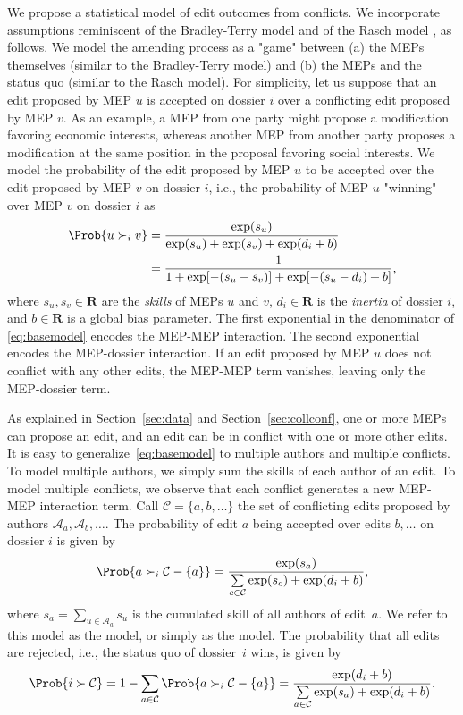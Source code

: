 We propose a statistical model of edit outcomes from conflicts.
We incorporate assumptions reminiscent of the Bradley-Terry model \cite{bradley1952rank} and of the Rasch model \cite{rasch1960probabilistic}, as follows.
We model the amending process as a "game" between (a) the MEPs themselves (similar to the Bradley-Terry model) and (b) the MEPs and the status quo (similar to the Rasch model).
For simplicity, let us suppose that an edit proposed by MEP $u$ is accepted on dossier $i$ over a conflicting edit proposed by MEP $v$.
As an example, a MEP from one party might propose a modification favoring economic interests, whereas another MEP from another party proposes a modification at the same position in the proposal favoring social interests.
We model the probability of the edit proposed by MEP $u$ to be accepted over the edit proposed by MEP $v$ on dossier $i$, i.e., the  probability of MEP $u$ "winning" over MEP $v$ on dossier $i$ as
\begin{align}
	\label{eq:basemodel}
  \Prob{ u \succ_i v }
	 & = \frac{\exp(s_u)}{\exp(s_u) + \exp(s_v) + \exp(d_i + b)} \nonumber  \\
	 & = \frac{1}{1 + \exp[ -( s_u - s_v ) ] + \exp[ -( s_u - d_i ) + b ]},
\end{align}
where $ s_u, s_v \in \mathbf{R} $ are the \textit{skills} of MEPs $u$ and $v$, $ d_i \in \mathbf{R} $ is the \textit{inertia} of dossier $i$, and $ b \in \mathbf{R} $ is a global bias parameter.
The first exponential in the denominator of \eqref{eq:basemodel} encodes the MEP-MEP interaction.
The second exponential encodes the MEP-dossier interaction.
If an edit proposed by MEP $u$ does not conflict with any other edits, the MEP-MEP term vanishes, leaving only the MEP-dossier term.

As explained in Section~\ref{sec:data} and Section~\ref{sec:collconf}, one or more MEPs can propose an edit, and an edit can be in conflict with one or more other edits.
It is easy to generalize~\eqref{eq:basemodel} to multiple authors and multiple conflicts.
To model multiple authors, we simply sum the skills of each author of an edit.
To model multiple conflicts, we observe that each conflict generates a new MEP-MEP interaction term.
Call \mbox{$\mathcal{C} = \{ a, b, \dots \}$} the set of conflicting edits proposed by authors $ \mathcal{A}_a, \mathcal{A}_b, \dots $.
The probability of edit $a$ being accepted over edits $b, \dots$ on dossier $i$ is given by
\begin{equation}
	\label{eq:multiple}
	\Prob{ a \succ_i \mathcal{C} - \{ a\} } =
	\frac{\exp(s_a) }{ \sum\limits_{c \in \mathcal{C} } \exp(s_c) + \exp(d_i + b) },
\end{equation}
where $s_a = \sum_{u \in \mathcal{A}_a} s_u$ is the cumulated skill of all authors of edit~$a$.
We refer to this model as the \warofwords{} model, or simply as the \wow{} model.
The probability that all edits are rejected, i.e., the status quo of dossier~$i$ wins, is given by
\begin{equation*}
	\Prob{i \succ \mathcal{C} }
	= 1 - \sum_{a \in \mathcal{C} } \Prob{ a \succ_i \mathcal{C} - \{ a \}}
	= \frac{\exp(d_i + b) }{ \sum\limits_{a \in \mathcal{C} } \exp(s_a) + \exp(d_i + b) }.
\end{equation*}

